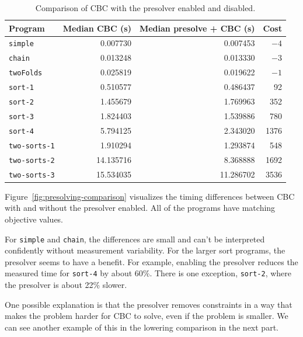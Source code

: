 \begin{table}[htbp]
    \centering
    \small
    \begin{tabular}{lrrr}
        \hline
        Program & Median CBC (s) & Median presolve + CBC (s) & Cost \\
        \hline
        \texttt{simple}      & 0.007730  & 0.007453  & $-4$ \\
        \texttt{chain}       & 0.013248  & 0.013330  & $-3$ \\
        \texttt{twoFolds}    & 0.025819  & 0.019622  & $-1$ \\
        \texttt{sort-1}      & 0.510577  & 0.486437  & 92 \\
        \texttt{sort-2}      & 1.455679  & 1.769963  & 352 \\
        \texttt{sort-3}      & 1.824403  & 1.539886  & 780 \\
        \texttt{sort-4}      & 5.794125  & 2.343020  & 1376 \\
        \texttt{two-sorts-1} & 1.910294  & 1.293874  & 548 \\
        \texttt{two-sorts-2} & 14.135716 & 8.368888  & 1692 \\
        \texttt{two-sorts-3} & 15.534035 & 11.286702 & 3536 \\
        \hline
    \end{tabular}
    \caption{Comparison of CBC with the presolver enabled and disabled.}
    \label{tab:presolving-results}
\end{table}



Figure~\ref{fig:presolving-comparison} visualizes the timing differences between CBC with and without the presolver enabled.
All of the programs have matching objective values.

For \texttt{simple} and \texttt{chain}, the differences are small and can't be interpreted confidently without measurement variability.
For the larger sort programs, the presolver seems to have a benefit.
For example, enabling the presolver reduces the measured time for \texttt{sort-4} by about 60\%.
There is one exception, \texttt{sort-2}, where the presolver is about 22\% slower.

One possible explanation is that the presolver removes constraints in a way that makes the problem harder for CBC to solve, even if the problem is smaller.
We can see another example of this in the lowering comparison in the next part.

\FloatBarrier
